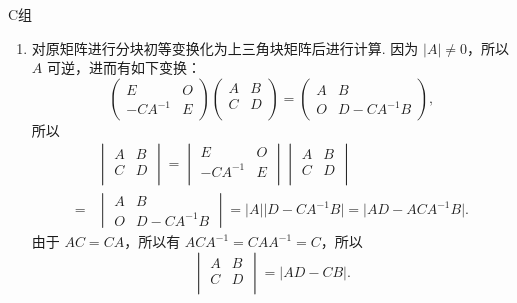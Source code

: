 \centerline{\heiti C组}
\begin{enumerate}
    \item 对原矩阵进行分块初等变换化为上三角块矩阵后进行计算. 因为 $\lvert A \rvert \neq 0$，所以 $A$ 可逆，进而有如下变换：
          \[\begin{pmatrix}
                  E        & O \\
                  -CA^{-1} & E
              \end{pmatrix} \begin{pmatrix}
                  A & B \\
                  C & D \\
              \end{pmatrix} = \begin{pmatrix}
                  A & B          \\
                  O & D-CA^{-1}B
              \end{pmatrix},\]
          所以
          \begin{align*}
                  & \begin{vmatrix}
                        A & B \\
                        C & D \\
                    \end{vmatrix}
              = \begin{vmatrix}
                    E        & O \\
                    -CA^{-1} & E \\
                \end{vmatrix}
              \begin{vmatrix}
                  A & B \\
                  C & D \\
              \end{vmatrix}       \\
              ={} & \begin{vmatrix}
                        A & B          \\
                        O & D-CA^{-1}B
                    \end{vmatrix}
              = \lvert A \rvert \lvert D-CA^{-1}B \rvert = \lvert AD-ACA^{-1}B \rvert.
          \end{align*} 由于 $AC = CA$，所以有 $ACA^{-1} = CAA^{-1} = C$，所以
          \[\begin{vmatrix}
                  A & B \\
                  C & D \\
              \end{vmatrix} = \lvert AD-CB \rvert.\]


\end{enumerate}
